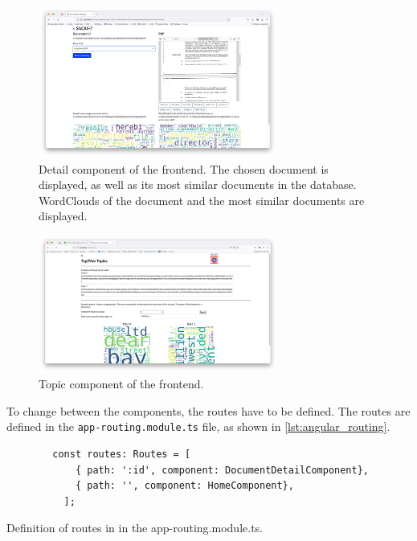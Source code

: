 \begin{figure}[htp] %
    \centering
    \includegraphics[width=0.7\textwidth]{images/UI/Home_detail.png}
    \caption{Detail component of the frontend.
    The chosen document is displayed, as well as its most similar documents in the database.
    WordClouds of the document and the most similar documents are displayed.
    }
    \label{fig:detail_comp}
\end{figure}


\begin{figure}[htp] %
    \centering
    \includegraphics[width=0.7\textwidth]{images/UI/Top2Vec_Topics.png}
    \caption{Topic component of the frontend.
    }
    \label{fig:top2vec_topic_comp}
\end{figure}


To change between the components, the routes have to be defined.
The routes are defined in the \texttt{app-routing.module.ts} file, as shown in \autoref{lst:angular_routing}.

\begin{listing}[htp]
    \begin{verbatim}
        const routes: Routes = [
            { path: ':id', component: DocumentDetailComponent},
            { path: '', component: HomeComponent},
          ];
    \end{verbatim}
    \caption{Definition of routes in \angular{} in the app-routing.module.ts.
    }
    \label{lst:angular_routing}
\end{listing}